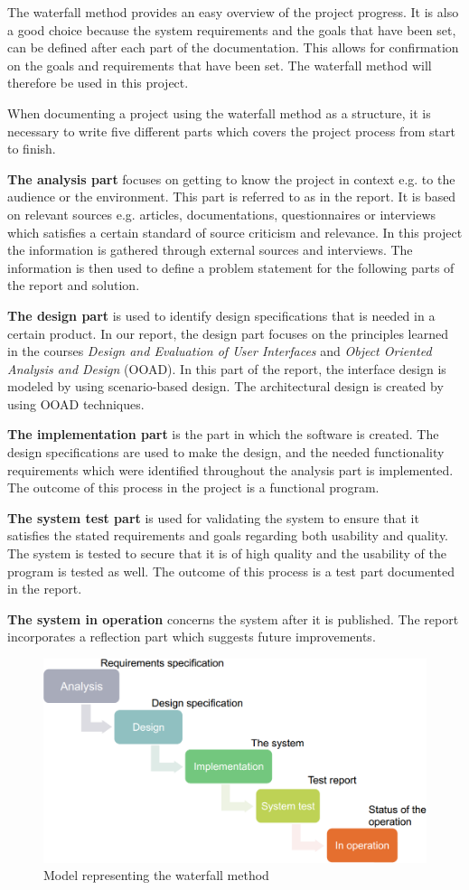 The waterfall method provides an easy overview of the project progress. It is also a good choice because the system requirements and the goals that have been set, can be defined after each part of the documentation. This allows for confirmation on the goals and requirements that have been set. The waterfall method will therefore be used in this project.       

When documenting a project using the waterfall method as a structure, it is necessary to write five different parts which covers the project process from start to finish.

\textbf{The analysis part} focuses on getting to know the project in context e.g. to the audience or the environment. This part is referred to as \textit{} in the report. It is based on relevant sources e.g. articles, documentations, questionnaires or interviews which satisfies a certain standard of source criticism and relevance. In this project the information is gathered through external sources and interviews. The information is then used to define a problem statement for the following parts of the report and solution.

\textbf{The design part} is used to identify design specifications that is needed in a certain product. In our report, the design part focuses on the principles learned in the courses \textit{Design and Evaluation of User Interfaces} and \textit{Object Oriented Analysis and Design} (OOAD). In this part of the report, the interface design is modeled by using scenario-based design. The architectural design is created by using OOAD techniques. 

\textbf{The implementation part} is the part in which the software is created. The design specifications are used to make the design, and the needed functionality requirements which were identified throughout the analysis part is implemented. The outcome of this process in the project is a functional program.

\textbf{The system test part} is used for validating the system to ensure that it satisfies the stated requirements and goals regarding both usability and quality. The system is tested to secure that it is of high quality and the usability of the program is tested as well. The outcome of this process is a test part documented in the report.

\textbf{The system in operation} concerns the system after it is published. The report incorporates a reflection part which suggests future improvements.

\begin{figure}[H]
\includegraphics[width=\linewidth, clip=true]{Grafik/FoodPlanner/Waterfall}
\centering
\caption{Model representing the waterfall method}
\end{figure}